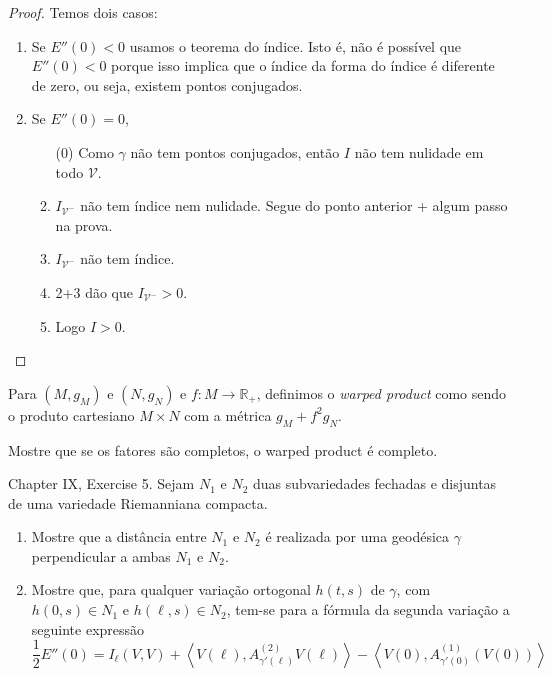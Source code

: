 \begin{proof}
Temos dois casos:
\begin{enumerate}
\item Se $E''(0)<0$ usamos o teorema do índice. Isto é, não é possível que
 $E''(0)<0$ porque isso implica que o índice da forma do índice é diferente
 de zero, ou seja, existem pontos conjugados.
\item Se $E''(0)=0$,
\begin{enumerate}
\item[(0)] Como $\gamma$ não tem pontos conjugados, então $I$ não tem
nulidade em todo  $\mathcal{V}$.
\item $I_{\mathcal{V}^-}$ não tem índice nem nulidade. Segue do ponto anterior + 
algum passo na prova.
\item $I_{\mathcal{V}^-}$ não tem índice.
\item 2+3 dão que $I_{\mathcal{V}^-}>0$.
\item Logo $I>0$.
\end{enumerate}
\end{enumerate}
\end{proof}

\begin{exercise}
\label{exercise-wraped-product}
Para $(M,g_M)$ e $(N,g_N)$ e $f:M \to \mathbb{R}_+$, definimos o {\it warped
product} como sendo o produto cartesiano $M\times N$ com a métrica 
 $g_M+f^2g_N$.

Mostre que se os fatores são completos, o warped product é completo.
\end{exercise}

\begin{exercise}
\label{exercise-two-submanifolds}
\cite{doc} Chapter IX, Exercise 5. Sejam $N_1$ e $N_2$ duas subvariedades
 fechadas e disjuntas de uma variedade Riemanniana compacta.
\begin{enumerate}
\item Mostre que a distância entre $N_1$ e $N_2$ é realizada por uma geodésica
	$\gamma$ perpendicular a ambas $N_1$ e $N_2$.
\item Mostre que, para qualquer variação ortogonal $h(t,s)$ de $\gamma$, com
$h(0,s) \in N_1$ e $h(\ell,s) \in N_2$, tem-se para a fórmula da segunda
variação a seguinte expressão
$$
\frac{1}{2}E''(0)=I_{\ell}(V,V)+
\left<V(\ell),A_{\gamma'(\ell)}^{(2)}V(\ell)\right>
-\left<V(0),A^{(1)}_{\gamma'(0)}(V(0))\right>
$$
\end{enumerate}
\end{exercise}


